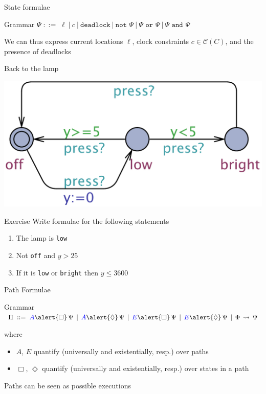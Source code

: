 \documentclass{beamer}
\def\dgold#1{{\alert{#1}}}
\def\dkb#1{{\blue #1}}
\begin{document}
\begin{frame}{State formulae}

        \begin{block}{Grammar}
        $
        \Psi\; ::=\; \ell ~|~ c ~|~ \texttt{deadlock} ~|~ \texttt{not~}\Psi ~|~ \Psi
        \texttt{ or }\Psi ~|~ \Psi \texttt{ and }\Psi 
        $
        \end{block}

        We can thus express \alert{current locations} $\ell$, \alert{clock
        constraints} $c \in \mathcal{C}(C)$, and the presence of \alert{deadlocks}
\end{frame}

\begin{slide}{Back to the lamp}

  \centering
  \includegraphics[scale=0.30]{./images/Lamp}

  \vfill
  \begin{block}{Exercise}
          Write formulae for the following statements
  \begin{enumerate}
    \item The lamp is \texttt{low}
    \item Not \texttt{off} and $y>25$
    \item If it is \texttt{low} or \texttt{bright} then $y\leq 3600$
  \end{enumerate}
  \end{block} 
\end{slide}

\begin{slide}{Path Formulae}
\newcommand{\Boxc}{\dgold{\Box}}
\newcommand{\Diamondc}{\dgold{\Diamond}}
\newcommand{\Ac}{\dkb{A}}
\newcommand{\Ec}{\dkb{E}}

\begin{block}{Grammar}
$\Pi\; ::=\;  \Ac \Boxc\, \Psi\, \mid\, \Ac\Diamondc\, \Psi\, \mid\, \Ec \Boxc\, \Psi\, \mid\, \Ec \Diamondc\, \Psi\, \mid\,  \Phi\, \leadsto\, \Psi
$
\end{block}

where
\begin{itemize}
\item \dkb{$A$, $E$} quantify (universally and existentially, resp.) over \dkb{paths}
\item \dgold{$\Box$, $\Diamond$} quantify (universally and existentially, resp.) over \dgold{states in a path}
\end{itemize}

Paths can be seen as possible executions
\end{slide}
\end{document}
